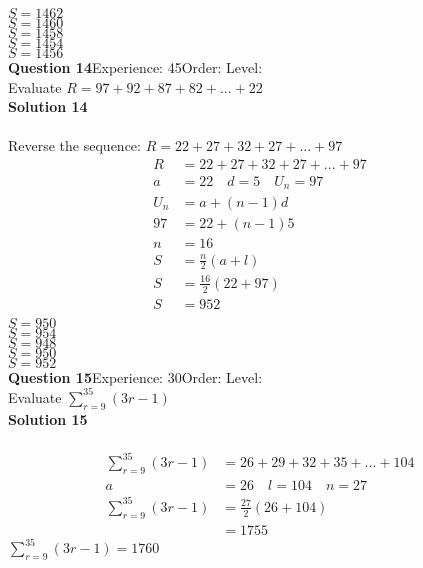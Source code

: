 \documentclass{article}
\begin{document}
$S=1462$\\
$S=1460$\\
$S=1458$\\
$S=1454$\\
$S=1456$\\
\noindent\textbf{Question 14}\hspace{20pt}Experience: 45\hspace{20pt}Order: \hspace{20pt}Level: \\[2pt]
Evaluate $R=97+92+87+82+...+22$\\[4pt]
\noindent\textbf{Solution 14}\\[2pt]
\\[-10pt]Reverse the sequence: $R=22+27+32+27+...+97$
\begin{align*}
R&=22+27+32+27+...+97\\[2pt]
a&=22\quad d=5 \quad U_n=97\\[2pt]
U_n&=a+(n-1)d\\[2pt]
97&=22+(n-1)5\\[2pt]
n&=16\\[12pt]
S&=\displaystyle\frac{n}{2}(a+l)\\[2pt]
S&=\displaystyle\frac{16}{2}(22+97)\\[2pt]
S&=952\\
\end{align*}
$S=950$\\
$S=954$\\
$S=948$\\
$S=950$\\
$S=952$\\
\noindent\textbf{Question 15}\hspace{20pt}Experience: 30\hspace{20pt}Order: \hspace{20pt}Level: \\[2pt]
Evaluate $\displaystyle\sum_{r=9}^{35} (3r-1)$\\[4pt]
\noindent\textbf{Solution 15}\\[2pt]
\\[-10pt]\begin{align*}
\displaystyle\sum_{r=9}^{35} (3r-1)&=26+29+32+35+...+104\\[2pt]
a&=26\quad l=104 \quad n=27\\[2pt]
\displaystyle\sum_{r=9}^{35} (3r-1)&=\displaystyle\frac{27}{2}(26+104)\\[2pt]
&=1755
\end{align*}
$\displaystyle\sum_{r=9}^{35} (3r-1)=1760$\\
\end{document}
